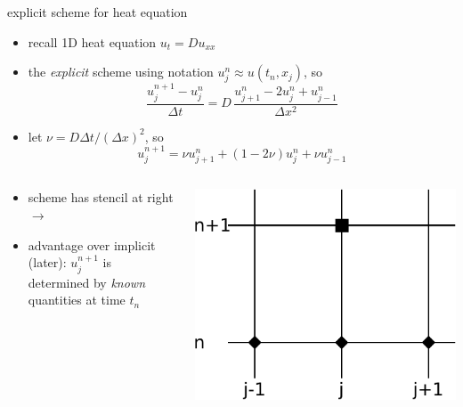 \begin{frame}{explicit scheme for heat equation}
\label{slide:explicit}

\begin{itemize}
\item recall 1D heat equation $u_t = D u_{xx}$
\item the \emph{explicit} scheme using notation $u_j^n \approx u(t_n,x_j)$, so
	$$\frac{u_j^{n+1} - u_j^n}{\Delta t} = D\,\frac{u_{j+1}^n - 2 u_j^n + u_{j-1}^n}{\Delta x^2}$$
\item let $\nu = D \Delta t / (\Delta x)^2$, so
	$$u_j^{n+1} = \nu u_{j+1}^n + (1 - 2 \nu) u_j^n + \nu u_{j-1}^n$$
\end{itemize}

\begin{columns}[b]
\begin{column}{0.70\textwidth}
\begin{itemize}
\item scheme has stencil at right \large $\to$ \normalsize
\item advantage over implicit (later): $u_j^{n+1}$ is determined by \emph{known} quantities at time $t_n$
\bigskip
\end{itemize}
\end{column}
\begin{column}{0.3\textwidth}
\includegraphics[width=1.0\textwidth]{photos/expstencil}
\end{column}
\end{columns}
\end{frame}


